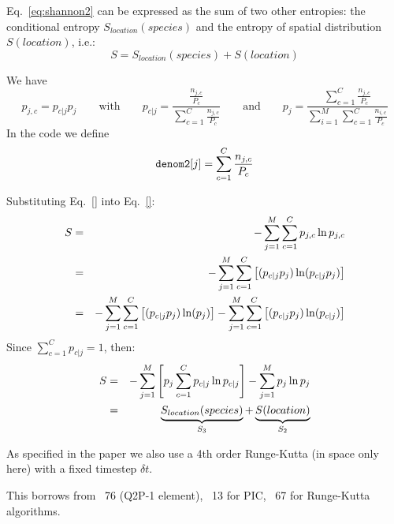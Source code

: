 Eq.~\eqref{eq:shannon2} can be expressed as the sum of two other entropies:
the conditional entropy $S_{location}(species)$ and the entropy of spatial 
distribution $S(location)$, i.e.:
\[
S=S_{location}(species) + S(location)
\]

We have 
\[
p_{j,c} = p_{c|j}p_j
\qquad
\text{with}
\qquad
p_{c|j}=\frac{\frac{n_{j,c}}{P_c}}{\sum\limits_{c=1}^C \frac{n_{j,c}}{P_c}}
\qquad
\text{and}
\qquad
p_j=\frac{\sum\limits_{c=1}^C \frac{n_{j,c}}{P_c}}{\sum\limits_{i=1}^M \sum\limits_{c=1}^C \frac{n_{i,c}}{P_c}} 
\]
In the code we define 
\[
{\tt denom2}[j]=\sum\limits_{c=1}^C \frac{n_{j,c}}{P_c}
\]


Substituting Eq.~\eqref{} into Eq.~\eqref{}:
\begin{eqnarray}
S
&=& -\sum_{j=1}^M \sum_{c=1}^C p_{j,c} \ln p_{j,c} \nonumber\\
&=& -\sum_{j=1}^M \sum_{c=1}^C \left[ (p_{c|j}p_j) \ln (p_{c|j}p_j) \right] \nonumber\\
&=& -\sum_{j=1}^M \sum_{c=1}^C \left[ (p_{c|j}p_j) \ln (p_j) \right] 
    -\sum_{j=1}^M \sum_{c=1}^C \left[ (p_{c|j}p_j) \ln (p_{c|j}) \right] \nonumber\\
\end{eqnarray}
Since $\sum\limits_{c=1}^C p_{c|j}=1$, then:
\begin{eqnarray}
S
&=&-\sum_{j=1}^M \left[
p_j \sum_{c=1}^C p_{c|j} \ln p_{c|j}
\right]
-
\sum_{j=1}^M p_j \ln p_j \nonumber\\
&=& 
\underbrace{S_{location}(species)}_{S_3} + \underbrace{S(location)}_{S_2}
\end{eqnarray}



As specified in the paper we also use a 4th order Runge-Kutta (in space only here)
with a fixed timestep $\delta t$.

This \stone borrows from \stone~76 (Q2P-1 element), \stone~13 for PIC, 
\stone~67 for Runge-Kutta algorithms.


